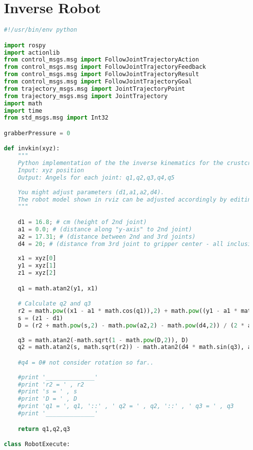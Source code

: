 \section{Inverse Robot}\label{sec:InvRobot}
\begin{lstlisting}[language=Python]
#!/usr/bin/env python

import rospy
import actionlib
from control_msgs.msg import FollowJointTrajectoryAction
from control_msgs.msg import FollowJointTrajectoryFeedback
from control_msgs.msg import FollowJointTrajectoryResult
from control_msgs.msg import FollowJointTrajectoryGoal
from trajectory_msgs.msg import JointTrajectoryPoint
from trajectory_msgs.msg import JointTrajectory
import math
import time
from std_msgs.msg import Int32

grabberPressure = 0

def invkin(xyz):
    """
    Python implementation of the the inverse kinematics for the crustcrawler
    Input: xyz position
    Output: Angels for each joint: q1,q2,q3,q4,q5
    
    You might adjust parameters (d1,a1,a2,d4).
    The robot model shown in rviz can be adjusted accordingly by editing au_crustcrawler_ax12.urdf
    """

    d1 = 16.8; # cm (height of 2nd joint)
    a1 = 0.0; # (distance along "y-axis" to 2nd joint)
    a2 = 17.31; # (distance between 2nd and 3rd joints)
    d4 = 20; # (distance from 3rd joint to gripper center - all inclusive, ie. also 4th joint)
    
    x1 = xyz[0]
    y1 = xyz[1]
    z1 = xyz[2]

    q1 = math.atan2(y1, x1)

    # Calculate q2 and q3
    r2 = math.pow((x1 - a1 * math.cos(q1)),2) + math.pow((y1 - a1 * math.sin(q1)),2)
    s = (z1 - d1)
    D = (r2 + math.pow(s,2) - math.pow(a2,2) - math.pow(d4,2)) / (2 * a2 * d4)
    
    q3 = math.atan2(-math.sqrt(1 - math.pow(D,2)), D)
    q2 = math.atan2(s, math.sqrt(r2)) - math.atan2(d4 * math.sin(q3), a2 + d4 * math.cos(q3))-(math.pi/2)

    #q4 = 0# not consider rotation so far..
    
    #print '______________'
    #print 'r2 = ' , r2
    #print 's = ' , s
    #print 'D = ' , D
    #print 'q1 = ', q1, '::' , ' q2 = ' , q2, '::' , ' q3 = ' , q3
    #print '______________'

    return q1,q2,q3

class RobotExecute:


\end{lstlisting}
